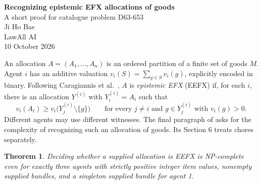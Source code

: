 \documentclass[11pt]{article}
\newtheorem{theorem}{Theorem}
\begin{document}
\begin{center}
{\Large\bfseries Recognizing epistemic EFX allocations of goods}\\[5pt]
{\small A short proof for catalogue problem D63-653}\\[3pt]
{\small Ji Ho Bae\\\small LawAll AI}\\[3pt]
{\small 10 October 2026}
\end{center}

An allocation $A=(A_1,\ldots,A_n)$ is an ordered partition of a finite
set of goods $M$. Agent $i$ has an additive valuation
$v_i(S)=\sum_{g\in S}v_i(g)$, explicitly encoded in binary.
Following Caragiannis et al.~\cite[Definitions 1--2]{fairness},
$A$ is \emph{epistemic EFX} (EEFX) if, for each $i$, there is an allocation
$Y^{(i)}$ with $Y^{(i)}_i=A_i$ such that
\[
 v_i(A_i)\geq v_i\bigl(Y^{(i)}_j\setminus\{g\}\bigr)
 \qquad\text{for every }j\ne i\text{ and }g\in Y^{(i)}_j
 \text{ with }v_i(g)>0.
\]
Different agents may use different witnesses. The final paragraph of
\cite[Section 4]{fairness} asks for the complexity of recognizing such an
allocation of goods. Its Section 6 treats chores separately.

\begin{theorem}
Deciding whether a supplied allocation is EEFX is NP-complete even for
exactly three agents with strictly positive integer item values, nonempty
supplied bundles, and a singleton supplied bundle for agent 1.
\end{theorem}
\end{document}
